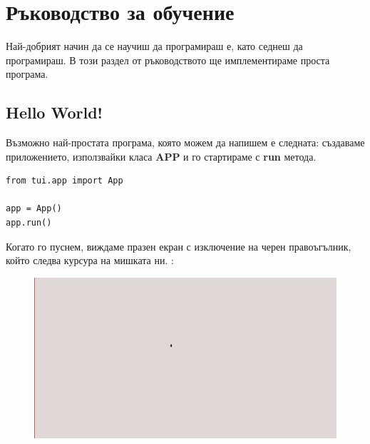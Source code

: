 \section{Ръководство за обучение}

        Най-добрият начин да се научиш да програмираш е, като седнеш да 
        програмираш. В този раздел от ръководството ще имплементираме проста
        програма.

        \subsection{Hello World!}

                Възможно най-простата програма, която можем да напишем е 
                следната: създаваме приложението, използвайки класа 
                \textbf{APP} и го стартираме с \textbf{run} метода.

                \begin{lstlisting}[style=py]
from tui.app import App

app = App()
app.run()
                \end{lstlisting}

                Когато го пуснем, виждаме празен екран с изключение на черен 
                правоъгълник, който следва курсура на мишката ни.
                :
        
                \vspace{5mm}
                \begin{figure}[h]
                        \centering
                        \includegraphics[width=150mm]{images/tutorial/basic.png}
                        \caption{}
                        \label{fig:app-barebone}
                \end{figure}
                \vspace{5mm}

